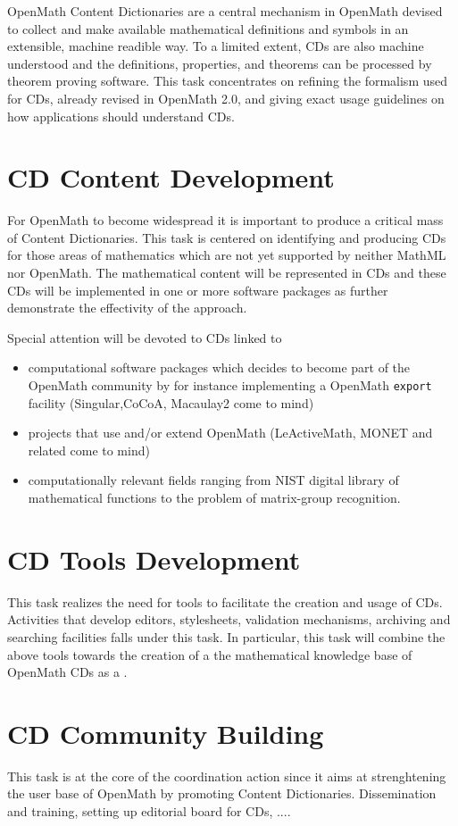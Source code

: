 \documentclass{euproposal}
\begin{document}
OpenMath Content Dictionaries are a central mechanism in OpenMath
devised to collect and make available mathematical definitions and
symbols in an extensible, machine readible way. To a limited extent,
CDs are also machine understood and the definitions, properties, and
theorems can be processed by theorem proving software.  This task
concentrates on refining the formalism used for CDs, already revised
in OpenMath 2.0, and giving exact usage guidelines on how applications
should understand CDs.  

\section{CD Content Development} 
\label{content}

For OpenMath to become widespread it is important to produce a
critical mass of Content Dictionaries. This task is centered on
identifying and producing CDs for those areas of mathematics which are
not yet supported by neither MathML nor OpenMath. The mathematical
content will be represented in CDs and these CDs will be implemented
in one or more software packages as further demonstrate the
effectivity of the approach. 

Special attention will be devoted to CDs linked to 
\begin{itemize}
\item computational software packages which decides to become part of the
OpenMath community by for instance implementing a OpenMath
\texttt{export} facility (Singular,CoCoA, Macaulay2 come to mind)

\item projects that use and/or extend OpenMath (LeActiveMath, MONET
  and related come to mind)
  
\item computationally relevant fields ranging from NIST digital
  library of mathematical functions to the problem of matrix-group
  recognition.
\end{itemize}


\section{CD Tools Development} 
\label{tools}

This task realizes the need for tools to facilitate the creation and
usage of CDs. Activities that develop editors, stylesheets, validation
mechanisms, archiving and searching facilities falls under this task.
In particular, this task will combine the above tools towards the
creation of a the mathematical knowledge base of OpenMath CDs as a .

\section{CD Community Building} 
\label{community}

This task is at the core of the coordination action since it aims at
strenghtening the user base of OpenMath by promoting Content
Dictionaries. Dissemination and training, setting up editorial board
for CDs, ....
\end{document}
